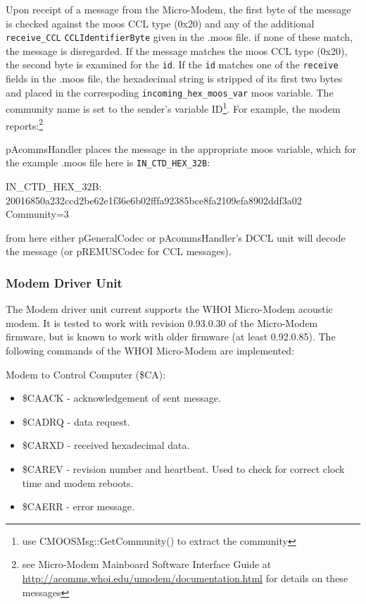 \documentclass[11pt, letterpaper, oneside]{memoir}
\begin{document}
Upon receipt of a message from the Micro-Modem, the first byte of the message is
checked against the moos CCL type (0x20) and any of the additional
\verb|receive_CCL| \verb|CCLIdentifierByte| given in the .moos
file. if none of these match, the message is disregarded. If the
message matches the moos CCL type (0x20), the second byte is examined
for the \verb|id|. If the \verb|id| matches one of the
\verb|receive| fields in the .moos file, the hexadecimal string is
stripped of its first two bytes and placed in the correspoding
\verb|incoming_hex_moos_var| moos variable. The community name is set to the
sender's variable ID\footnote{use CMOOSMsg::GetCommunity() to extract
  the community}. For example, the modem reports:\footnote{see Micro-Modem Mainboard Software Interface
  Guide at \url{http://acomms.whoi.edu/umodem/documentation.html} for
  details on these messages}
\resetbvlinenumber %

pAcommsHandler places the message in the appropriate moos variable, which
for the example .moos file here is \verb|IN_CTD_HEX_32B|:

\begin{boxedverbatim}
IN_CTD_HEX_32B: 20016850a232ccd2be62e1f36e6b02fffa92385bce8fa2109efa8902ddf3a02 
{Community=3}
\end{boxedverbatim}
\resetbvlinenumber

from here either pGeneralCodec or pAcommsHandler's DCCL unit will decode the message (or pREMUSCodec for CCL messages). 

\subsubsection{Modem Driver Unit}

The Modem driver unit current supports the WHOI Micro-Modem acoustic modem. It is tested to work with revision 0.93.0.30 of the Micro-Modem firmware, but is known to work with older firmware (at least 0.92.0.85). The following commands of the WHOI Micro-Modem are implemented:

Modem to Control Computer (\$CA):
\begin{itemize}
\item \$CAACK - acknowledgement of sent message. 
\item \$CADRQ - data request. 
\item \$CARXD - received hexadecimal data.
\item \$CAREV - revision number and heartbeat. Used to check for correct clock time and modem reboots.
\item \$CAERR - error message.
\end{itemize}
\end{document}
